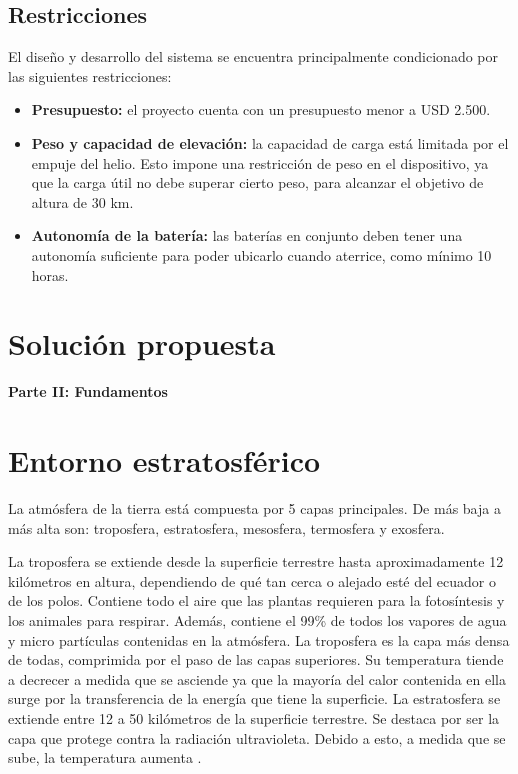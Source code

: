\documentclass[12pt,a4paper]{article}
\newcommand{\parte}[1]{%
  \phantomsection
  \addcontentsline{toc}{parte}{#1}%
  \begin{center}{\Large\bfseries #1\par}\end{center}%
}
\begin{document}
\subsection{Restricciones}\label{restricciones}

El diseño y desarrollo del sistema se encuentra principalmente condicionado por las siguientes restricciones:

\begin{itemize}
\item
  \textbf{Presupuesto:} el proyecto cuenta con un presupuesto menor a USD 2.500.
\item
  \textbf{Peso y capacidad de elevación:} la capacidad de carga está limitada por el empuje del helio. Esto impone una restricción de peso en el dispositivo, ya que la carga útil no debe superar cierto peso, para alcanzar el objetivo de altura de 30 km.
\item
  \textbf{Autonomía de la batería:} las baterías en conjunto deben tener una autonomía suficiente para poder ubicarlo cuando aterrice, como mínimo 10 horas.
\end{itemize}

% 



\section{Solución propuesta}\label{solucion-propuesta}

\newpage
\parte{Parte II: Fundamentos}

\section{Entorno estratosférico}\label{condiciones-ambientales}

La atmósfera de la tierra está compuesta por 5 capas principales. De más baja a más alta son: troposfera, estratosfera, mesosfera, termosfera y exosfera.

La troposfera se extiende desde la superficie terrestre hasta aproximadamente 12 kilómetros en altura, dependiendo de qué tan cerca o alejado esté del ecuador o de los polos. Contiene todo el aire que las plantas requieren para la fotosíntesis y los animales para respirar. Además, contiene el 99\% de todos los vapores de agua y micro partículas contenidas en la atmósfera. La troposfera es la capa más densa de todas, comprimida por el paso de las capas superiores. Su temperatura tiende a decrecer a medida que se asciende ya que la mayoría del calor contenida en ella surge por la transferencia de la energía que tiene la superficie. La estratosfera se extiende entre 12 a 50 kilómetros de la superficie terrestre. Se destaca por ser la capa que protege contra la radiación ultravioleta. Debido a esto, a medida que se sube, la temperatura aumenta \cite{ref1}.
\end{document}

